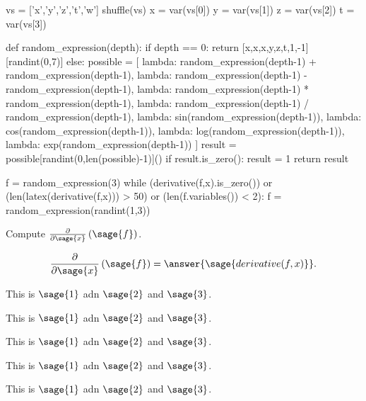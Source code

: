 \documentclass{ximera}
\author{Jim Fowler}
\begin{document}
\begin{sagesilent}
  vs = ['x','y','z','t','w']
  shuffle(vs)
  x = var(vs[0])
  y = var(vs[1])
  z = var(vs[2])
  t = var(vs[3])  

  def random_expression(depth):
    if depth == 0:
      return [x,x,x,y,z,t,1,-1][randint(0,7)]
    else:
      possible = [
        lambda: random_expression(depth-1) + random_expression(depth-1),
        lambda: random_expression(depth-1) - random_expression(depth-1),
        lambda: random_expression(depth-1) * random_expression(depth-1),
        lambda: random_expression(depth-1) / random_expression(depth-1),
        lambda: sin(random_expression(depth-1)),
        lambda: cos(random_expression(depth-1)),
        lambda: log(random_expression(depth-1)),
        lambda: exp(random_expression(depth-1))
      ]
      result = possible[randint(0,len(possible)-1)]()
      if result.is_zero():
        result = 1
      return result

  f = random_expression(3)
  while (derivative(f,x).is_zero()) or (len(latex(derivative(f,x))) > 50) or (len(f.variables()) < 2):
    f = random_expression(randint(1,3))
  
\end{sagesilent}

\begin{exercise}

  Compute $\frac{\partial}{\partial\sage{x}} \left( \sage{f} \right)$.

  \begin{prompt}
    \[
      \frac{\partial}{\partial\sage{x}} \left( \sage{f} \right) = \answer{\sage{derivative(f,x)}}.
    \]
  \end{prompt}

  \begin{hint}
    This is $\sage{1}$ adn $\sage{2}$  and $\sage{3}$.
  \end{hint}

  \begin{hint}
    This is $\sage{1}$ adn $\sage{2}$  and $\sage{3}$.
  \end{hint}

  \begin{hint}
    This is $\sage{1}$ adn $\sage{2}$  and $\sage{3}$.
  \end{hint}
  \begin{hint}
    This is $\sage{1}$ adn $\sage{2}$  and $\sage{3}$.
  \end{hint}

  \begin{hint}
    This is $\sage{1}$ adn $\sage{2}$  and $\sage{3}$.
  \end{hint}  
  
\end{exercise}
\end{document}
